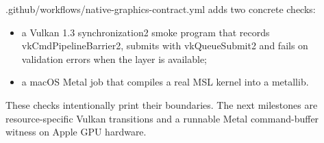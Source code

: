 .github/workflows/native-graphics-contract.yml adds two concrete checks:

\begin{itemize}
\tightlist
\item
  a Vulkan 1.3 synchronization2 smoke program that records vkCmdPipelineBarrier2, submits with vkQueueSubmit2 and fails on validation errors when the layer is available;
\item
  a macOS Metal job that compiles a real MSL kernel into a metallib.
\end{itemize}

These checks intentionally print their boundaries. The next milestones are resource-specific Vulkan transitions and a runnable Metal command-buffer witness on Apple GPU hardware.
